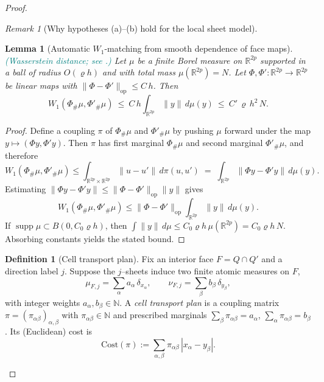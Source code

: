 \documentclass[11pt]{article}
\newcommand{\REVMZ}[1]{\textcolor{teal}{#1}}  %
\numberwithin{equation}{section}  %
\theoremstyle{plain}
\newtheorem{lemma}[theorem]{Lemma}
\theoremstyle{definition}
\newtheorem{definition}[theorem]{Definition}
\theoremstyle{remark}
\newtheorem{remark}[theorem]{Remark}
\newcommand{\R}{\mathbb{R}}
\begin{document}
\begin{proof}
\begin{remark}[Why hypotheses (a)--(b) hold for the local sheet model]
\end{remark}

\begin{lemma}[Automatic $W_1$-matching from smooth dependence of face maps]\label{lem:w1-auto}
\REVMZ{(Wasserstein distance; see \cite{Villani03}.)}
Let $\mu$ be a finite Borel measure on $\R^{2p}$ supported in a ball of radius $O(\varrho h)$ and with total mass $\mu(\R^{2p})=N$.
Let $\Phi,\Phi':\R^{2p}\to\R^{2p}$ be linear maps with $\|\Phi-\Phi'\|_{\mathrm{op}}\le C\,h$.
Then
\[
W_1(\Phi_\#\mu,\Phi'_\#\mu)\ \le\ C\,h\int_{\R^{2p}}\|y\|\,d\mu(y)\ \le\ C'\,\varrho\,h^2\,N.
\]
\end{lemma}


\begin{proof}
Define a coupling $\pi$ of $\Phi_\#\mu$ and $\Phi'_\#\mu$ by pushing $\mu$ forward under the map
$y\mapsto (\Phi y,\Phi' y)$.
Then $\pi$ has first marginal $\Phi_\#\mu$ and second marginal $\Phi'_\#\mu$, and therefore
\[
W_1(\Phi_\#\mu,\Phi'_\#\mu)
\le
\int_{\R^{2p}\times\R^{2p}} \|u-u'\|\,d\pi(u,u')
\;=\;
\int_{\R^{2p}} \|\Phi y-\Phi' y\|\,d\mu(y).
\]
Estimating $\|\Phi y-\Phi' y\|\le \|\Phi-\Phi'\|_{\mathrm{op}}\|y\|$ gives
\[
W_1(\Phi_\#\mu,\Phi'_\#\mu)
\le \|\Phi-\Phi'\|_{\mathrm{op}}\int_{\R^{2p}}\|y\|\,d\mu(y).
\]
If $\operatorname{supp}\mu\subset B(0,C_0 \varrho h)$, then $\int\|y\|\,d\mu\le C_0 \varrho h\,\mu(\R^{2p})=C_0 \varrho h\,N$.
Absorbing constants yields the stated bound.
\end{proof}



\begin{definition}[Cell transport plan]\label{def:cell-transport-plan}
Fix an interior face $F=Q\cap Q'$ and a direction label $j$. Suppose the $j$--sheets induce two finite atomic measures on $F$,
\[
\mu_{F,j}=\sum_{\alpha} a_\alpha\,\delta_{x_\alpha},
\qquad
\nu_{F,j}=\sum_{\beta} b_\beta\,\delta_{y_\beta},
\]
with integer weights $a_\alpha,b_\beta\in\mathbb N$. A \emph{cell transport plan} is a coupling matrix $\pi=(\pi_{\alpha\beta})_{\alpha,\beta}$ with $\pi_{\alpha\beta}\in\mathbb N$ and prescribed marginals $\sum_\beta \pi_{\alpha\beta}=a_\alpha$, $\sum_\alpha \pi_{\alpha\beta}=b_\beta$. Its (Euclidean) cost is 
\[
\mathrm{Cost}(\pi):=\sum_{\alpha,\beta}\pi_{\alpha\beta}\,|x_\alpha-y_\beta|.
\]


\end{definition}
\end{proof}
\end{document}
